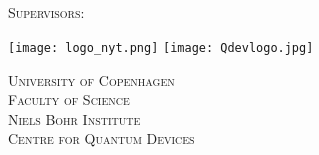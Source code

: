 \newcommand*{\titleTMB}{\begingroup
\centering

\vspace*{1cm}

{\Huge\scshape \docTitle} \\[1.5\baselineskip]
\vspace*{3cm}
{\Large\itshape \docSubject}\\[0.5\baselineskip]
{\large\itshape \docDate}\\[0.2\baselineskip]
{\Large\scshape \docAuthor}\\

\vspace{4cm}
{\Large\scshape Supervisors: \docSupervisor}\\
\vfill
    \centering
\begin{minipage}[c]{0.18\textwidth}
        \texttt{[image: logo\_nyt.png]}
        \texttt{[image: Qdevlogo.jpg]}
\end{minipage}
   \hfill
\begin{minipage}[c]{0.82\textwidth}
\flushright
{\Large\scshape University of Copenhagen}\\
\vspace{3pt}
{\Large\scshape Faculty of Science}\\
\vspace{3pt}
{\Large\scshape Niels Bohr Institute}\\
\vspace{3pt}
{\Large\scshape Centre for Quantum Devices}\\

\end{minipage}
\endgroup}


\begin{titlingpage}
\titleTMB
\end{titlingpage}